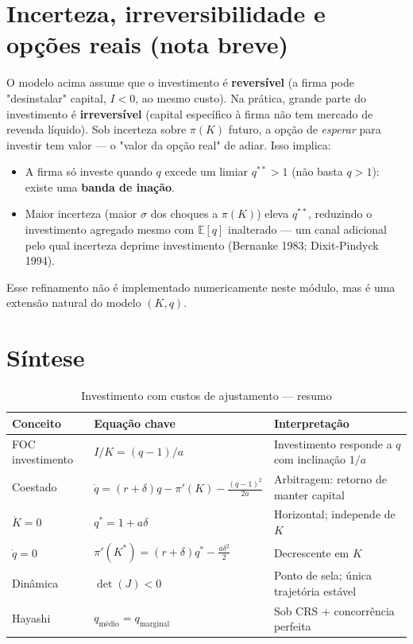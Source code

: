 \documentclass[11pt,a4paper]{article}
\newcommand{\E}{\mathbb{E}}
\begin{document}
\section{Incerteza, irreversibilidade e opções reais (nota breve)}

O modelo acima assume que o investimento é \textbf{reversível} (a firma
pode "desinstalar" capital, $I<0$, ao mesmo custo). Na prática, grande
parte do investimento é \textbf{irreversível} (capital específico à
firma não tem mercado de revenda líquido). Sob incerteza sobre $\pi(K)$
futuro, a opção de \emph{esperar} para investir tem valor --- o
"valor da opção real" de adiar. Isso implica:
\begin{itemize}
  \item A firma só investe quando $q$ excede um limiar
    $q^{**} > 1$ (não basta $q>1$): existe uma \textbf{banda de inação}.
  \item Maior incerteza (maior $\sigma$ dos choques a $\pi(K)$) eleva
    $q^{**}$, reduzindo o investimento agregado mesmo com $\E[q]$
    inalterado --- um canal adicional pelo qual incerteza deprime
    investimento (Bernanke 1983; Dixit-Pindyck 1994).
\end{itemize}
Esse refinamento não é implementado numericamente neste módulo, mas é
uma extensão natural do modelo $(K,q)$.

\section{Síntese}

\begin{table}[h!]
  \centering
  \caption{Investimento com custos de ajustamento --- resumo}
  \begin{tabular}{lll}
    \toprule
    Conceito & Equação chave & Interpretação \\
    \midrule
    FOC investimento & $I/K=(q-1)/a$ & Investimento responde a $q$ com inclinação $1/a$ \\
    Coestado & $\dot q=(r+\delta)q-\pi'(K)-\frac{(q-1)^2}{2a}$ & Arbitragem: retorno de manter capital \\
    $\dot K=0$ & $q^*=1+a\delta$ & Horizontal; independe de $K$ \\
    $\dot q=0$ & $\pi'(K^*)=(r+\delta)q^*-\frac{a\delta^2}{2}$ & Decrescente em $K$ \\
    Dinâmica & $\det(J)<0$ & Ponto de sela; única trajetória estável \\
    Hayashi & $q_{\text{médio}}=q_{\text{marginal}}$ & Sob CRS + concorrência perfeita \\
    \bottomrule
  \end{tabular}
\end{table}
\end{document}
